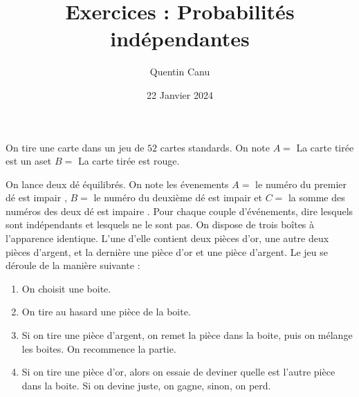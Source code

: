 \documentclass{exam}
\title{Exercices : Probabilités indépendantes}
\author{Quentin Canu}
\date{22 Janvier 2024}
\begin{document}
\maketitle
\begin{questions}
\question On tire une carte dans un jeu de $52$ cartes standards. On note $A=$ \og La carte tirée est un as\fg et $B=$ \og La carte tirée est rouge\fg.
\vspace*{0.5cm}
\question On lance deux dé équilibrés. On note les évenements $A =$ \og le numéro du premier dé est impair \fg, $B =$ \og le numéro du deuxième dé est impair \fg et $C =$ \og la somme des numéros des deux dé est impaire \fg. Pour chaque couple d'événements, dire lesquels sont indépendants et lesquels ne le sont pas.
\vspace*{0.5cm}
\question On dispose de trois boîtes à l'apparence identique. L'une d'elle contient deux pièces d'or, une autre deux pièces d'argent, et la dernière une pièce d'or et une pièce d'argent. Le jeu se déroule de la manière suivante :
\begin{enumerate}
\item On choisit une boite.
\item On tire au hasard une pièce de la boite.
\item Si on tire une pièce d'argent, on remet la pièce dans la boite, puis on mélange les boites. On recommence la partie.
\item Si on tire une pièce d'or, alors on essaie de deviner quelle est l'autre pièce dans la boite. Si on devine juste, on gagne, sinon, on perd. 
\end{enumerate}
\end{questions}
\end{document}
